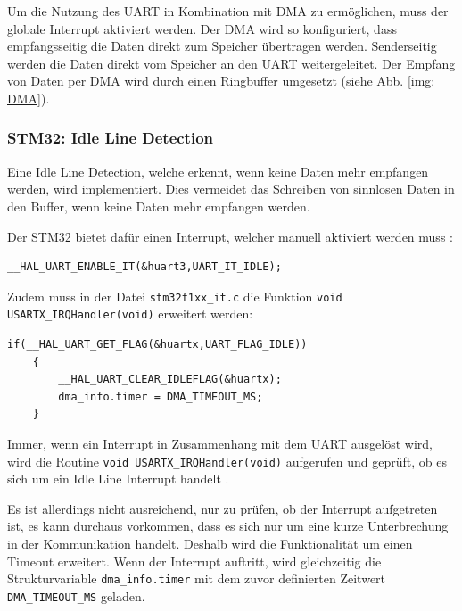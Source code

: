 Um die Nutzung des \ac{UART} in Kombination mit \ac{DMA} zu ermöglichen, muss der globale Interrupt
aktiviert werden. Der \ac{DMA} wird so konfiguriert, dass empfangsseitig die Daten direkt zum Speicher übertragen werden. Senderseitig werden die Daten
direkt vom Speicher an den \ac{UART} weitergeleitet. Der Empfang von Daten per \ac{DMA} wird durch einen Ringbuffer umgesetzt (siehe Abb. \ref{img: DMA}).


\newpage
\subsubsection{STM32: Idle Line Detection}
  \label{subsub: Idle}
  Eine Idle Line Detection, welche erkennt, wenn keine Daten mehr empfangen werden, wird implementiert. Dies vermeidet das Schreiben von sinnlosen
  Daten in den Buffer, wenn keine Daten mehr empfangen werden.

  \smallskip

  Der STM32 bietet dafür einen Interrupt, welcher manuell aktiviert werden muss \citep{STM32_Ref}:
  \begin{lstlisting}[caption={\textit{Aktivierung Idle Line Interrupt}}]
    __HAL_UART_ENABLE_IT(&huart3,UART_IT_IDLE);
  \end{lstlisting}
  
  Zudem muss in der Datei \lstinline!stm32f1xx_it.c! die Funktion \lstinline!void USARTX_IRQHandler(void)! erweitert werden:

  \begin{lstlisting}[caption={\textit{Idle Line Interrupt Clear}}]
    if(__HAL_UART_GET_FLAG(&huartx,UART_FLAG_IDLE))
    {
        __HAL_UART_CLEAR_IDLEFLAG(&huartx);
        dma_info.timer = DMA_TIMEOUT_MS;
    }
  \end{lstlisting}

  Immer, wenn ein Interrupt in Zusammenhang mit dem \ac{UART} ausgelöst wird, wird die Routine \lstinline!void USARTX_IRQHandler(void)! 
  aufgerufen und geprüft, ob es sich um ein Idle Line Interrupt handelt \citep{STM32_Ref}. 

  \smallskip

  Es ist allerdings nicht ausreichend, nur zu prüfen, ob der Interrupt aufgetreten ist, es kann durchaus vorkommen, dass es sich nur um eine
  kurze Unterbrechung in der Kommunikation handelt. Deshalb wird die Funktionalität um einen Timeout erweitert. Wenn der Interrupt auftritt, wird
  gleichzeitig die Strukturvariable \lstinline!dma_info.timer! mit dem zuvor definierten Zeitwert \lstinline!DMA_TIMEOUT_MS! geladen.

